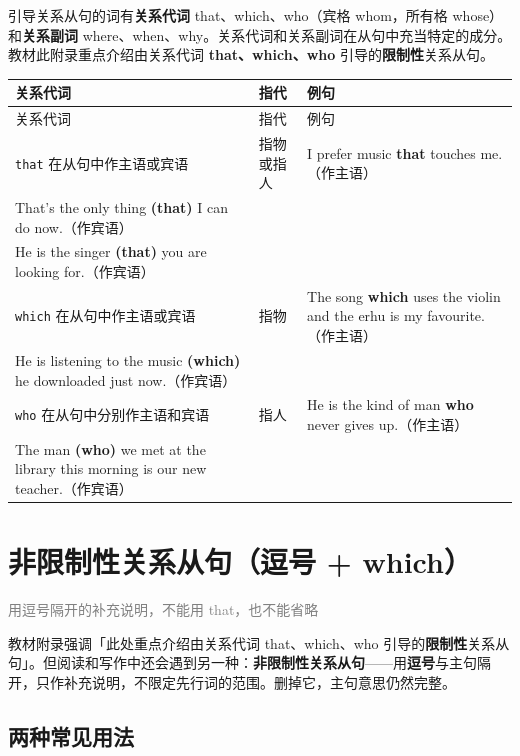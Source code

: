 \documentclass[11pt,a4paper]{ctexart}
\begin{document}
引导关系从句的词有\textbf{关系代词} that、which、who（宾格 whom，所有格 whose）和\textbf{关系副词} where、when、why。关系代词和关系副词在从句中充当特定的成分。教材此附录重点介绍由关系代词 \textbf{that、which、who} 引导的\textbf{限制性}关系从句。

{\footnotesize
\begin{longtable}{p{4.47cm}p{4.47cm}p{4.47cm}}
\hline
关系代词 & 指代 & 例句 \\
\hline
\endfirsthead
\hline
关系代词 & 指代 & 例句 \\
\hline
\endhead
\hline
\endfoot
\texttt{that} 在从句中作主语或宾语 & 指物或指人 & I prefer music \textbf{that} touches me.（作主语）\\ That’s the only thing \textbf{(that)} I can do now.（作宾语）\\ He is the singer \textbf{(that)} you are looking for.（作宾语） \\
\texttt{which} 在从句中作主语或宾语 & 指物 & The song \textbf{which} uses the violin and the erhu is my favourite.（作主语）\\ He is listening to the music \textbf{(which)} he downloaded just now.（作宾语） \\
\texttt{who} 在从句中分别作主语和宾语 & 指人 & He is the kind of man \textbf{who} never gives up.（作主语）\\ The man \textbf{(who)} we met at the library this morning is our new teacher.（作宾语） \\
\end{longtable}
}

\begin{center}\end{center}

\section{非限制性关系从句（逗号 + which）}
\noindent\textcolor{gray}{用逗号隔开的补充说明，不能用 that，也不能省略}\par\smallskip
教材附录强调「此处重点介绍由关系代词 that、which、who 引导的\textbf{限制性}关系从句」。但阅读和写作中还会遇到另一种：\textbf{非限制性关系从句}——用\textbf{逗号}与主句隔开，只作补充说明，不限定先行词的范围。删掉它，主句意思仍然完整。

\subsection*{两种常见用法}
\end{document}
